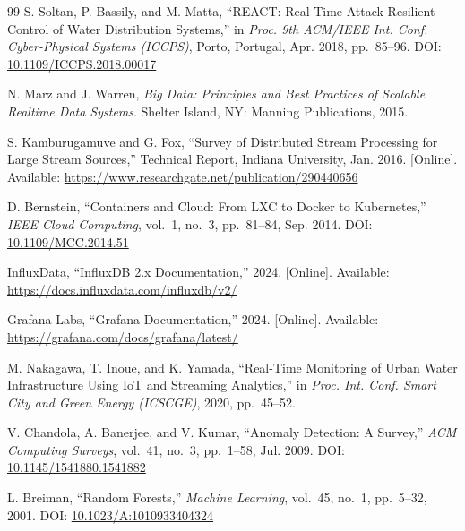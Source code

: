 \documentclass[12pt, a4paper]{article}
\begin{document}
\begin{thebibliography}{99}
S. Soltan, P. Bassily, and M. Matta,
``REACT: Real-Time Attack-Resilient Control of Water Distribution Systems,''
in \emph{Proc. 9th ACM/IEEE Int. Conf. Cyber-Physical Systems (ICCPS)},
Porto, Portugal, Apr. 2018, pp.~85--96.
\newblock DOI: \href{https://doi.org/10.1109/ICCPS.2018.00017}{10.1109/ICCPS.2018.00017}

N. Marz and J. Warren,
\emph{Big Data: Principles and Best Practices of Scalable Realtime Data
Systems}.
Shelter Island, NY: Manning Publications, 2015.

S. Kamburugamuve and G. Fox,
``Survey of Distributed Stream Processing for Large Stream Sources,''
Technical Report, Indiana University, Jan. 2016.
[Online]. Available: \url{https://www.researchgate.net/publication/290440656}

D. Bernstein,
``Containers and Cloud: From LXC to Docker to Kubernetes,''
\emph{IEEE Cloud Computing}, vol.~1, no.~3, pp.~81--84, Sep. 2014.
\newblock DOI: \href{https://doi.org/10.1109/MCC.2014.51}{10.1109/MCC.2014.51}

InfluxData,
``InfluxDB 2.x Documentation,''
2024.
[Online]. Available: \url{https://docs.influxdata.com/influxdb/v2/}

Grafana Labs,
``Grafana Documentation,''
2024.
[Online]. Available: \url{https://grafana.com/docs/grafana/latest/}

M. Nakagawa, T. Inoue, and K. Yamada,
``Real-Time Monitoring of Urban Water Infrastructure Using IoT and
Streaming Analytics,''
in \emph{Proc. Int. Conf. Smart City and Green Energy (ICSCGE)},
2020, pp.~45--52.

V. Chandola, A. Banerjee, and V. Kumar,
``Anomaly Detection: A Survey,''
\emph{ACM Computing Surveys}, vol.~41, no.~3, pp.~1--58, Jul. 2009.
\newblock DOI: \href{https://doi.org/10.1145/1541880.1541882}{10.1145/1541880.1541882}

L. Breiman,
``Random Forests,''
\emph{Machine Learning}, vol.~45, no.~1, pp.~5--32, 2001.
\newblock DOI: \href{https://doi.org/10.1023/A:1010933404324}{10.1023/A:1010933404324}

\end{thebibliography}
\end{document}

